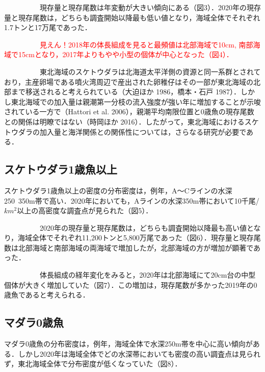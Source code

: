\documentclass[11pt]{article} %
\begin{document}
\begin{linenumbers}
\ \ \ \ \ \ \ \ \ \ 
現存量と現存尾数は年変動が大きい傾向にある（図3）．2020年の現存量と現存尾数は，どちらも調査開始以降最も低い値となり，海域全体でそれぞれ1.7トンと17万尾であった．

\ \ \ \ \ \ \ \ \ \ 
\textcolor{red}{見えん！2018年の体長組成を見ると最頻値は北部海域で10cm, 南部海域で15cmとなり，2017年よりもやや小型の個体が中心となった（図4）．}

\ \ \ \ \ \ \ \ \ \ 
東北海域のスケトウダラは北海道太平洋側の資源と同一系群とされており，主産卵場である噴火湾周辺で産出された卵稚仔はその一部が東北海域の北部まで移送されると考えられている（大迫ほか 1986，橋本・石戸 1987）．しかし東北海域での加入量は親潮第一分枝の流入強度が強い年に増加することが示唆されている一方で（Hattori et al. 2006），親潮平均南限位置と0歳魚の現存尾数との関係は明瞭ではない（時岡ほか 2016）．したがって，東北海域におけるスケトウダラの加入量と海洋関係との関係性については，さらなる研究が必要である．

\subsection{スケトウダラ1歳魚以上}
スケトウダラ1歳魚以上の密度の分布密度は，例年，A〜Cラインの水深250~350m帯で高い．2020年においても，Aラインの水深350m帯において10千尾/$km^2$以上の高密度な調査点が見られた（図5）．

\ \ \ \ \ \ \ \ \ \ 
2020年の現存量と現存尾数は，どちらも調査開始以降最も高い値となり，海域全体でそれぞれ11,200トンと5,800万尾であった（図6）．現存量と現存尾数は北部海域と南部海域の両海域で増加したが，北部海域の方が増加が顕著であった．

\ \ \ \ \ \ \ \ \ \ 
体長組成の経年変化をみると，2020年は北部海域にて20cm台の中型個体が大きく増加していた（図7）．この増加は，現存尾数が多かった2019年の0歳魚であると考えられる．


\subsection{マダラ0歳魚}
マダラ0歳魚の分布密度は，例年，海域全体で水深250m帯を中心に高い傾向がある．しかし2020年は海域全体でどの水深帯においても密度の高い調査点は見られず，東北海域全体で分布密度が低くなっていた（図8）．


\end{linenumbers}
\end{document}
